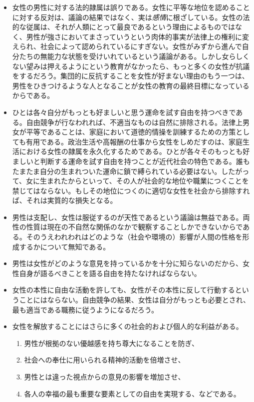 \documentclass[dvipdfmx,uplatex]{jsarticle}
\begin{document}
\begin{itemize}
\item 女性の男性に対する法的隷属は誤りである。女性に平等な地位を認めることに対する反対は、議論の結果ではなく、実は\emph{感情}に根ざしている。女性の法的な従属は、それが人類にとって最良であるという理由によるものではなく、男性が強さにおいてまさっていうという肉体的事実が法律上の権利に変えられ、社会によって認められているにすぎない。女性がみずから進んで自分たちの無能力な状態を受けいれているという議論がある。しかし女らしくない望みは押えるようにという教育がなかったら、もっと多くの女性が抗議をするだろう。集団的に反抗することを女性が好まない理由のもう一つは、男性をひきつけるような人となることが女性の教育の最終目標になっているからである。

\item ひとは各々自分がもっとも好ましいと思う運命を試す自由を持つべきである。自由競争が行なわれれば、不適当なものは自然に排除される。法律上男女が平等であることは、家庭において道徳的情操を訓練するための方策としても有用である。政治生活や高報酬の仕事から女性をしめだすのは、家庭生活における女性の隷属を永久化するためである。ひとが各々そのもっとも好ましいと判断する運命を試す自由を持つことが近代社会の特色である。誰もたまたま自分の生まれついた運命に鎖で縛られている必要はない。したがって、女に生まれたからといって、その人が社会的な地位や職業につくことを禁じてはならない。もしその地位につくのに適切な女性を社会から排除すれば、それは実質的な損失となる。


\item 男性は支配し、女性は服従するのが天性であるという議論は無益である。両性の性質は現在の不自然な関係のなかで観察することしかできないからである。そのうえわれわれはどのような（社会や環境の）影響が人間の性格を形成するかについて無知である。

\item 男性は女性がどのような意見を持っているかを十分に知らないのだから、女性自身が語るべきことを語る自由を持たなければならない。
   

\item 女性の本性に自由な活動を許しても、女性がその本性に反して行動するということにはならない。自由競争の結果、女性は自分がもっとも必要とされ、最も適当である職務に従うようになるだろう。

 \item 女性を解放することにはさらに多くの社会的および個人的な利益がある。

   \begin{enumerate}
   \item 男性が根拠のない優越感を持ち尊大になることを防ぎ、
   \item 社会への奉仕に用いられる精神的活動を倍増させ、
   \item 男性とは違った視点からの意見の影響を増加させ、
   \item 各人の幸福の最も重要な要素としての自由を実現する、などである。
   \end{enumerate}

 \end{itemize}
\end{document}
